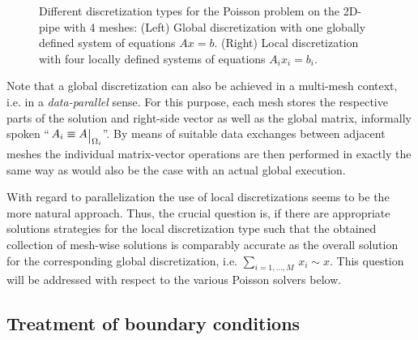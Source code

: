 \begin{figure}[ht]
\begin{center}
\quad\quad

\end{center}
\caption[Global discretization versus collection of local discretizations]{Different discretization types for the Poisson problem on the 2D-pipe with 4 meshes: (Left) Global discretization with one globally defined system of equations $Ax=b$. (Right) Local discretization with four locally defined systems of equations $A_i x_i=b_i$.}
\label{FIG_SCARC_global_vs_local_discretization}
\end{figure}
Note that a global discretization can also be achieved in a multi-mesh context, i.e. in a {\it data-parallel} sense. 
For this purpose, each mesh stores the respective parts of the solution and right-side vector as well as the global matrix, 
informally spoken ``$\,A_i \equiv \restrict{A}{\Omega_i}$''.
By means of suitable data exchanges between adjacent meshes the individual matrix-vector operations are then performed 
in exactly the same way as would also be the case with an actual global execution.

With regard to parallelization the use of local discretizations seems to be the more natural approach. 
Thus, the crucial question is, if there are appropriate solutions strategies for the local discretization type 
such that the obtained collection of mesh-wise solutions is comparably accurate as the overall solution for the corresponding global discretization, i.e. $\sum_{i=1, \ldots, M}\, x_i \sim x$. 
This question will be addressed with respect to the various Poisson solvers below.


\subsection{Treatment of boundary conditions}
\label{SEC_SCARC_boundary_conditions}

